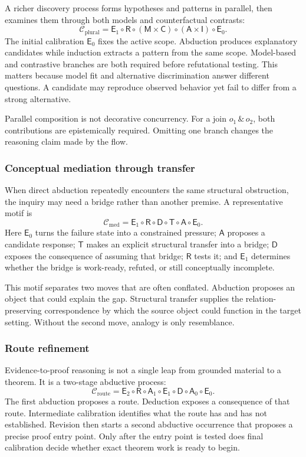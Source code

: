 A richer discovery process forms hypotheses and patterns in parallel, then
examines them through both models and counterfactual contrasts:
\[
  \mathcal{C}_{\mathrm{plural}}
  =\mathsf{E}_{1}\circ\mathsf{R}\circ
  (\mathsf{M}\times\mathsf{C})\circ
  (\mathsf{A}\times\mathsf{I})\circ\mathsf{E}_{0}.
\]
The initial calibration $\mathsf{E}_{0}$ fixes the active scope. Abduction
produces explanatory candidates while induction extracts a pattern from the
same scope. Model-based and contrastive branches are both required before
refutational testing. This matters because model fit and alternative
discrimination answer different questions. A candidate may reproduce observed
behavior yet fail to differ from a strong alternative.

Parallel composition is not decorative concurrency. For a join
$o_1\,\&\,o_2$, both contributions are epistemically required. Omitting one
branch changes the reasoning claim made by the flow.

\subsubsection{Conceptual mediation through transfer}

When direct abduction repeatedly encounters the same structural obstruction,
the inquiry may need a bridge rather than another premise. A representative
motif is
\[
  \mathcal{C}_{\mathrm{med}}
  =\mathsf{E}_{1}\circ\mathsf{R}\circ\mathsf{D}\circ
  \mathsf{T}\circ\mathsf{A}\circ\mathsf{E}_{0}.
\]
Here $\mathsf{E}_{0}$ turns the failure state into a constrained pressure;
$\mathsf{A}$ proposes a candidate response; $\mathsf{T}$ makes an explicit
structural transfer into a bridge; $\mathsf{D}$ exposes the consequence of
assuming that bridge; $\mathsf{R}$ tests it; and $\mathsf{E}_{1}$ determines
whether the bridge is work-ready, refuted, or still conceptually incomplete.

This motif separates two moves that are often conflated. Abduction proposes an
object that could explain the gap. Structural transfer supplies the
relation-preserving correspondence by which the source object could function
in the target setting. Without the second move, analogy is only resemblance.

\subsubsection{Route refinement}

Evidence-to-proof reasoning is not a single leap from grounded material to a
theorem. It is a two-stage abductive process:
\[
  \mathcal{C}_{\mathrm{route}}
  =\mathsf{E}_{2}\circ\mathsf{R}\circ\mathsf{A}_{1}\circ
  \mathsf{E}_{1}\circ\mathsf{D}\circ\mathsf{A}_{0}\circ
  \mathsf{E}_{0}.
\]
The first abduction proposes a route. Deduction exposes a consequence of that
route. Intermediate calibration identifies what the route has and has not
established. Revision then starts a second abductive occurrence that proposes
a precise proof entry point. Only after the entry point is tested does final
calibration decide whether exact theorem work is ready to begin.


